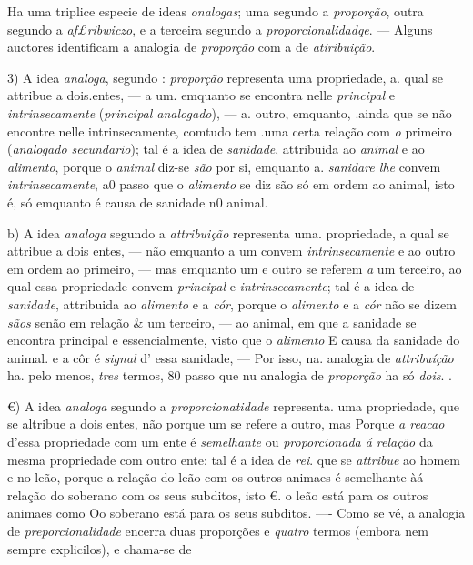 Ha uma triplice especie de ideas \emph{onalogas}; uma segundo a \emph{proporção}, outra segundo a \emph{af£ribwiczo}, e a terceira segundo a \emph{proporcionalidadqe}. --- Alguns auctores identificam a analogia de \emph{proporção} com a de \emph{atiribuição}.

3) A idea \emph{analoga}, segundo : \emph{proporção} representa uma propriedade, a. qual se attribue a dois.entes, --- a um. emquanto se encontra nelle \emph{principal} e \emph{intrinsecamente} (\emph{principal analogado}), --- a. outro, emquanto, .ainda que se não encontre nelle intrinsecamente, comtudo tem .uma certa relação com \emph{o} primeiro (\emph{analogado secundario}); tal é a idea de \emph{sanidade}, attribuida ao \emph{animal} e ao \emph{alimento}, porque o \emph{animal} diz-se \emph{são} por si, emquanto a. \emph{sanidare lhe} convem \emph{intrinsecamente}, a0 passo que o \emph{alimento} se diz são só em ordem ao animal, isto é, só emquanto é causa de sanidade n0 animal.

b) A idea \emph{analoga} segundo a \emph{attribuição} representa uma. propriedade, a qual se attribue a dois entes, --- não emquanto a um convem \emph{intrinsecamente} e ao outro em ordem ao primeiro, --- mas emquanto um e outro se referem \emph{a} um terceiro, ao qual essa propriedade convem \emph{principal} e \emph{intrinsecamente}; tal é a idea de \emph{sanidade}, attribuida ao \emph{alimento} e a \emph{cór}, porque o \emph{alimento} e a \emph{cór} não se dizem \emph{sãos} senão em relação \& um terceiro, --- ao animal, em que a sanidade se encontra principal e essencialmente, visto que o \emph{alimento} E causa da sanidade do animal. e a côr é \emph{signal} d' essa sanidade, --- Por isso, na. analogia de \emph{attribuíção} ha. pelo menos, \emph{tres} termos, 80 passo que nu analogia de \emph{proporção} ha só \emph{dois}. .

€) A idea \emph{analoga} segundo a \emph{proporcionatidade} representa. uma propriedade, que se altribue a dois entes, não porque um se refere a outro, mas Porque \emph{a reacao} d'essa propriedade com um ente é \emph{semelhante} ou \emph{proporcionada á relação} da mesma propriedade com outro ente: tal é a idea de \emph{rei}. que se \emph{attribue} ao homem e no leão, porque a relação do leão com os outros animaes é semelhante àá relação do soberano com os seus subditos, isto €. o leão está para os outros animaes como Oo soberano está para os seus subditos. ---- Como se vé, a analogia de \emph{preporcionalidade} encerra duas proporções e \emph{quatro} termos (embora nem sempre explicilos), e chama-se de

